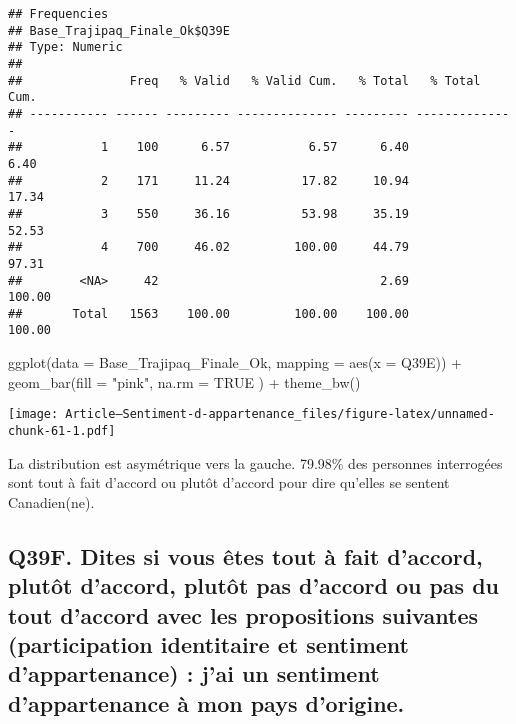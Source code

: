\documentclass[
]{article}
\newenvironment{Shaded}{\begin{snugshade}}{\end{snugshade}}
\newcommand{\AttributeTok}[1]{\textcolor[rgb]{0.77,0.63,0.00}{#1}}
\newcommand{\ConstantTok}[1]{\textcolor[rgb]{0.00,0.00,0.00}{#1}}
\newcommand{\FunctionTok}[1]{\textcolor[rgb]{0.00,0.00,0.00}{#1}}
\newcommand{\NormalTok}[1]{#1}
\newcommand{\SpecialCharTok}[1]{\textcolor[rgb]{0.00,0.00,0.00}{#1}}
\newcommand{\StringTok}[1]{\textcolor[rgb]{0.31,0.60,0.02}{#1}}
\begin{document}
\begin{verbatim}
## Frequencies  
## Base_Trajipaq_Finale_Ok$Q39E  
## Type: Numeric  
## 
##               Freq   % Valid   % Valid Cum.   % Total   % Total Cum.
## ----------- ------ --------- -------------- --------- --------------
##           1    100      6.57           6.57      6.40           6.40
##           2    171     11.24          17.82     10.94          17.34
##           3    550     36.16          53.98     35.19          52.53
##           4    700     46.02         100.00     44.79          97.31
##        <NA>     42                               2.69         100.00
##       Total   1563    100.00         100.00    100.00         100.00
\end{verbatim}

\begin{Shaded}
\begin{Highlighting}[]
\FunctionTok{ggplot}\NormalTok{(}\AttributeTok{data =}\NormalTok{ Base\_Trajipaq\_Finale\_Ok, }\AttributeTok{mapping =} \FunctionTok{aes}\NormalTok{(}\AttributeTok{x =}\NormalTok{ Q39E)) }\SpecialCharTok{+}
  \FunctionTok{geom\_bar}\NormalTok{(}\AttributeTok{fill =} \StringTok{"pink"}\NormalTok{,}
           \AttributeTok{na.rm =} \ConstantTok{TRUE}
\NormalTok{           ) }\SpecialCharTok{+}
  \FunctionTok{theme\_bw}\NormalTok{()}
\end{Highlighting}
\end{Shaded}

\texttt{[image: Article---Sentiment-d-appartenance\_files/figure-latex/unnamed-chunk-61-1.pdf]}

La distribution est asymétrique vers la gauche. 79.98\% des personnes
interrogées sont tout à fait d'accord ou plutôt d'accord pour dire
qu'elles se sentent Canadien(ne).

\hypertarget{q39f.-dites-si-vous-uxeates-tout-uxe0-fait-daccord-plutuxf4t-daccord-plutuxf4t-pas-daccord-ou-pas-du-tout-daccord-avec-les-propositions-suivantes-participation-identitaire-et-sentiment-dappartenance-jai-un-sentiment-dappartenance-uxe0-mon-pays-dorigine.}{%
\subsection{Q39F. Dites si vous êtes tout à fait d'accord, plutôt
d'accord, plutôt pas d'accord ou pas du tout d'accord avec les
propositions suivantes (participation identitaire et sentiment
d'appartenance) : j'ai un sentiment d'appartenance à mon pays
d'origine.}\label{q39f.-dites-si-vous-uxeates-tout-uxe0-fait-daccord-plutuxf4t-daccord-plutuxf4t-pas-daccord-ou-pas-du-tout-daccord-avec-les-propositions-suivantes-participation-identitaire-et-sentiment-dappartenance-jai-un-sentiment-dappartenance-uxe0-mon-pays-dorigine.}}
\end{document}
